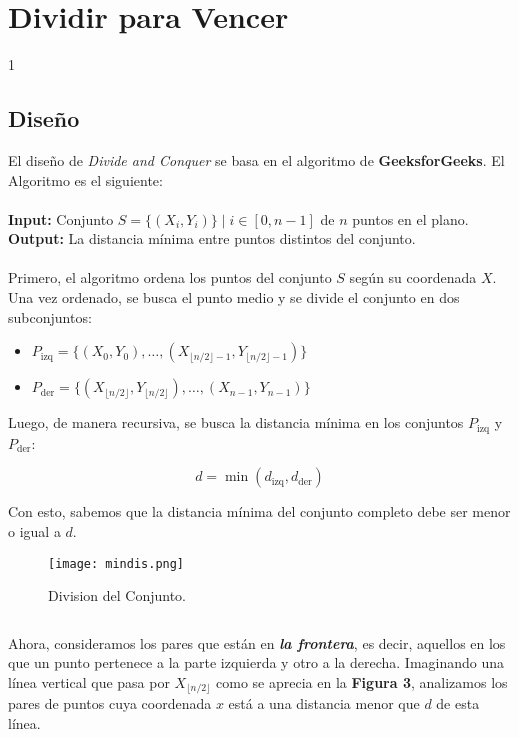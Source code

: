 \documentclass{article}
\begin{document}
\section{Dividir para Vencer}
    1\subsection{Diseño}
El diseño de \textit{Divide and Conquer} se basa en el algoritmo de \textbf{GeeksforGeeks}\cite{geeks2023}. El Algoritmo es el siguiente:\\\textbf{\\Input:} Conjunto $S = \{(X_i, Y_i)\} \mid i \in [0, n-1]$ de $n$ puntos en el plano.\\\textbf{Output:} La distancia mínima entre puntos distintos del conjunto.\\
\\Primero, el algoritmo ordena los puntos del conjunto $S$ según su coordenada $X$. 
Una vez ordenado, se busca el punto medio y se divide el conjunto en dos subconjuntos:

\begin{itemize}
    \item $P_{\text{izq}} = \{(X_0, Y_0),\ldots, (X_{\lfloor n/2 \rfloor - 1}, Y_{\lfloor n/2 \rfloor - 1})\}$
    \item $P_{\text{der}} = \{(X_{\lfloor n/2 \rfloor}, Y_{\lfloor n/2 \rfloor}),\ldots, (X_{n-1}, Y_{n-1})\}$
\end{itemize}
Luego, de manera recursiva, se busca la distancia mínima en los conjuntos $P_{\text{izq}}$ y $P_{\text{der}}$:

\[
d = \min(d_{\text{izq}}, d_{\text{der}})
\]

Con esto, sabemos que la distancia mínima del conjunto completo debe ser menor o igual a $d$.
\begin{figure}[H] %
    \centering
    \texttt{[image: mindis.png]} %
    \caption{Division del Conjunto.}
    \label{fig:etiqueta_imagen}
\end{figure}
\begin{lstlisting}
\end{lstlisting}
Ahora, consideramos los pares que están en \textit{\textbf{la frontera}}, es decir, aquellos en los que un punto pertenece a la parte izquierda y otro a la derecha.
Imaginando una línea vertical que pasa por $X_{\lfloor n/2 \rfloor}$ como se aprecia en la \textbf{Figura 3}, analizamos los pares de puntos cuya coordenada $x$ está a una distancia menor que $d$ de esta línea.
\end{document}
